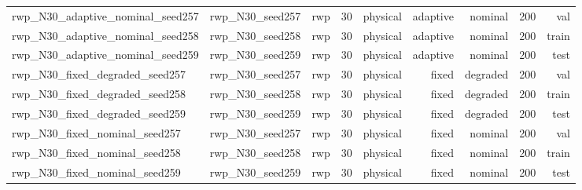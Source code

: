 \begin{tabular}{lrrrrrrrr}
rwp\_N30\_adaptive\_nominal\_seed257 & rwp\_N30\_seed257 & rwp & 30 & physical & adaptive & nominal & 200 & val \\
rwp\_N30\_adaptive\_nominal\_seed258 & rwp\_N30\_seed258 & rwp & 30 & physical & adaptive & nominal & 200 & train \\
rwp\_N30\_adaptive\_nominal\_seed259 & rwp\_N30\_seed259 & rwp & 30 & physical & adaptive & nominal & 200 & test \\
rwp\_N30\_fixed\_degraded\_seed257 & rwp\_N30\_seed257 & rwp & 30 & physical & fixed & degraded & 200 & val \\
rwp\_N30\_fixed\_degraded\_seed258 & rwp\_N30\_seed258 & rwp & 30 & physical & fixed & degraded & 200 & train \\
rwp\_N30\_fixed\_degraded\_seed259 & rwp\_N30\_seed259 & rwp & 30 & physical & fixed & degraded & 200 & test \\
rwp\_N30\_fixed\_nominal\_seed257 & rwp\_N30\_seed257 & rwp & 30 & physical & fixed & nominal & 200 & val \\
rwp\_N30\_fixed\_nominal\_seed258 & rwp\_N30\_seed258 & rwp & 30 & physical & fixed & nominal & 200 & train \\
rwp\_N30\_fixed\_nominal\_seed259 & rwp\_N30\_seed259 & rwp & 30 & physical & fixed & nominal & 200 & test \\
\bottomrule
\end{tabular}